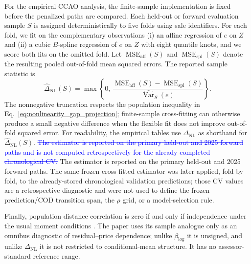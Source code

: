 \documentclass[10pt]{article}
\theoremstyle{definition}
\newcommand{\Var}{\operatorname{Var}}
\newcommand{\1}{\mathbf{1}}
\newcommand{\oldtext}[1]{\textcolor{blue}{\sout{#1}}}
\newcommand{\latesttext}[1]{\textcolor{latestPurple}{#1}}
\begin{document}
For the empirical CCAO analysis, the finite-sample implementation is fixed before
the penalized paths are compared. Each held-out or forward evaluation sample $S$ is
assigned deterministically to five folds using sale identifiers. For each fold, we
fit on the complementary observations (i) an affine regression of $e$ on $Z$ and
(ii) a cubic $B$-spline regression of $e$ on $Z$ with eight quantile knots, and we
score both fits on the omitted fold. Let
$\operatorname{MSE}_{\mathrm{aff}}(S)$ and
$\operatorname{MSE}_{\mathrm{spl}}(S)$ denote the resulting pooled out-of-fold mean
squared errors. The reported sample statistic is
\begin{equation}
\label{eq:nonlinearity_gap_estimator}
\widehat{\Delta}_{\mathrm{NL}}(S)
=
\max\left\{
0,\,
\frac{
\operatorname{MSE}_{\mathrm{aff}}(S)
-
\operatorname{MSE}_{\mathrm{spl}}(S)
}{
\widehat{\Var}_S(e)
}
\right\}.
\end{equation}
The nonnegative truncation respects the population inequality in
Eq.~\eqref{eq:nonlinearity_gap_projection}; finite-sample cross-fitting can otherwise
produce a small negative difference when the flexible fit does not improve
out-of-fold squared error. For readability, the empirical tables use
$\Delta_{\mathrm{NL}}$ as shorthand for
$\widehat{\Delta}_{\mathrm{NL}}(S)$. \oldtext{The estimator is reported on the primary
held-out and 2025 forward paths and is not computed retrospectively for the already
completed chronological CV.}
\latesttext{The estimator is reported on the primary held-out and 2025 forward paths. The same frozen cross-fitted estimator was later applied, fold by fold, to the already-stored chronological validation predictions; those CV values are a retrospective diagnostic and were not used to define the frozen prediction/COD transition span, the $\rho$ grid, or a model-selection rule.}

Finally, population distance correlation is zero if and only if independence under
the usual moment conditions \cite{SzekelyRizzoBakirov2007}. The paper uses its
sample analogue only as an omnibus diagnostic of residual--price dependence; unlike
$\beta_{\log}$ it is unsigned, and unlike $\Delta_{\mathrm{NL}}$ it is not restricted
to conditional-mean structure. It has no assessor-standard reference range.

\end{document}
